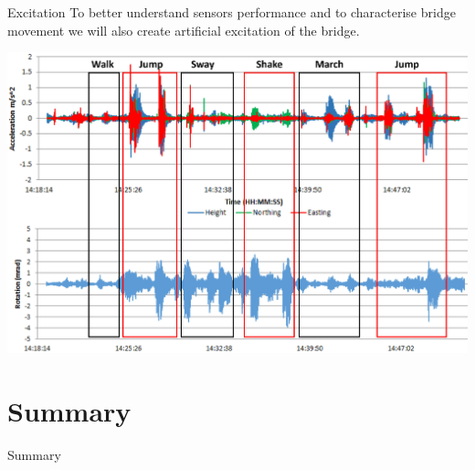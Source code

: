 \documentclass[11pt]{beamer}
\begin{document}
\begin{frame}{Excitation}%
	To better understand sensors performance and to characterise bridge movement we will also create artificial excitation of the bridge.

	\centering
	\includegraphics[height=.6\textheight]{pic/excitation.jpg}
\end{frame}


\section{Summary}


	\begin{frame}{Summary}
	\end{frame}


\end{document}
